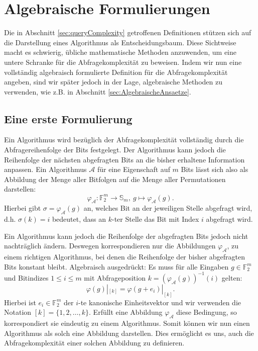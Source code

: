 \documentclass[10pt,a4paper, footheight=1mm, bibliography=totoc]{scrreprt}
\theoremstyle{definition}
\begin{document}
\section{Algebraische Formulierungen}

Die in Abschnitt \ref{sec:queryComplexity} getroffenen
Definitionen stützen sich auf die Darstellung eines 
Algorithmus als Entscheidungsbaum.
Diese Sichtweise macht es schwierig, übliche mathematische
Methoden anzuwenden, um eine untere Schranke für die
Abfragekomplexität zu beweisen.
Indem wir nun eine vollständig algebraisch
formulierte Definition für die Abfragekomplexität angeben,
sind wir später jedoch in der Lage, algebraische Methoden zu verwenden,
wie z.B. in Abschnitt \ref{sec:AlgebraischeAnsaetze}.

\subsection{Eine erste Formulierung}
\label{sec:AlgebraischeCharakterisierung}
Ein Algorithmus wird bezüglich der Abfragekomplexität vollständig
durch die Abfragereihenfolge der Bits festgelegt.
Der Algorithmus kann jedoch die Reihenfolge der nächsten
abgefragten Bits an die bisher erhaltene Information anpassen.
Ein Algorithmus $\mathcal{A}$ für eine Eigenschaft
auf $m$ Bits lässt sich also als Abbildung der Menge aller
Bitfolgen auf die Menge aller Permutationen darstellen:
$$ \varphi_\mathcal{A}: \mathbb{F}_2^m \to \mathbb{S}_m,
   ~g \mapsto \varphi_\mathcal{A}(g).$$
Hierbei gibt $\sigma = \varphi_\mathcal{A}(g)$ an, welches
Bit an der jeweiligen Stelle abgefragt wird,
d.h. $\sigma(k)=i$ bedeutet, dass an $k$-ter
Stelle das Bit mit Index $i$ abgefragt wird.

Ein Algorithmus kann jedoch die Reihenfolge der 
abgefragten Bits jedoch nicht nachträglich ändern. Deswegen
korrespondieren nur die Abbildungen $\varphi_\mathcal{A}$,
zu einem richtigen Algorithmus, bei denen die Reihenfolge
der bisher abgefragten Bits konstant bleibt.
Algebraisch ausgedrückt: Es muss für alle Eingaben
$g\in \mathbb{F}_2^m$ und Bitindizes $1\leq i \leq m$
mit Abfrageposition $k=(\varphi_\mathcal{A}(g))^{-1}(i)$
gelten:
\begin{equation}
\label{eq:NichtNachtraeglichAendern}
\varphi(g)|_{[k]} = \varphi(g+e_i)|_{[k]}.
\end{equation}
Hierbei ist $e_i\in \mathbb{F}_2^m$
der $i$-te kanonische Einheitsvektor
und wir verwenden die Notation $[k]=\{1,2, \dots, k\}$.
Erfüllt eine Abbildung $\varphi_\mathcal{A}$ diese
Bedingung, so korrespondiert sie eindeutig
zu einem Algorithmus. Somit können wir nun
einen Algorithmus als solch eine Abbildung darstellen.
Dies ermöglicht es uns, auch die Abfragekomplexität
einer solchen Abbildung zu definieren.
\end{document}
